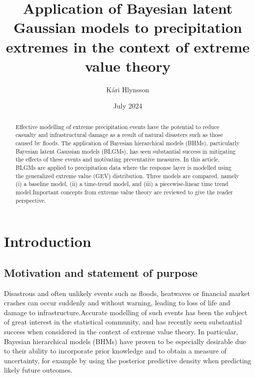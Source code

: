 \documentclass[12pt, a4paper]{article}
\title{Application of Bayesian latent Gaussian models to
       precipitation extremes in the context of extreme value theory}
\author{Kári Hlynsson}
\date{July 2024}
\begin{document}
  
  \maketitle
  
  \begin{abstract}
    \noindent
    Effective modelling of extreme precipitation events have the potential
    to reduce casualty and infrastructural damage as a result of natural
    disasters such as those caused by floods. The application of Bayesian
    hierarchical models (BHMs), particularly Bayesian latent Gaussian models
    (BLGMs), has seen substantial success in mitigating the effects of these
    events and motivating preventative measures. 
    In this article, BLGMs are applied to precipitation data where the response
    layer is modelled using the generalized extreme value (GEV) distribution.
    Three models are compared, namely (i) a baseline model, (ii) a time-trend
    model, and (iii) a piecewise-linear time trend model.\@ Important concepts
    from extreme value theory are reviewed to give the reader perspective.
  \end{abstract}

  \section{Introduction}
  \subsection{Motivation and statement of purpose}
  Disastrous and often unlikely events such as floods, heatwaves or financial
  market crashes can occur suddenly and without warning, leading to
  loss of life and damage to infrastructure.\@ Accurate modelling of such
  events has been the subject of great interest in the statistical community,
  and has recently seen substantial success when considered in the context of
  extreme value theory. In particular, Bayesian hierarchical models (BHMs) have
  proven to be especially desirable due to their ability to incorporate prior
  knowledge and to obtain a measure of uncertainty, for example by using the 
  posterior predictive density when predicting likely future outcomes.
\end{document}
